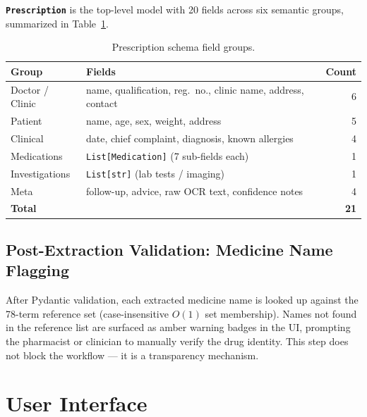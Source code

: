 \documentclass[12pt,a4paper]{article}
\begin{document}
\textbf{\texttt{Prescription}} is the top-level model with 20 fields across
six semantic groups, summarized in Table~\ref{tab:schema}.

\begin{table}[H]
\centering
\caption{Prescription schema field groups.}
\label{tab:schema}
\begin{tabular}{@{}llr@{}}
\toprule
\textbf{Group} & \textbf{Fields} & \textbf{Count} \\
\midrule
Doctor / Clinic   & name, qualification, reg.\ no., clinic name, address, contact & 6 \\
Patient           & name, age, sex, weight, address                                & 5 \\
Clinical          & date, chief complaint, diagnosis, known allergies               & 4 \\
Medications       & \texttt{List[Medication]} (7 sub-fields each)                  & 1 \\
Investigations    & \texttt{List[str]} (lab tests / imaging)                       & 1 \\
Meta              & follow-up, advice, raw OCR text, confidence notes              & 4 \\
\midrule
\textbf{Total}    &                                                                & \textbf{21} \\
\bottomrule
\end{tabular}
\end{table}

\subsection{Post-Extraction Validation: Medicine Name Flagging}

After Pydantic validation, each extracted medicine name is looked up against the
78-term reference set (case-insensitive $O(1)$ set membership). Names not found
in the reference list are surfaced as amber warning badges in the UI, prompting the
pharmacist or clinician to manually verify the drug identity. This step does not
block the workflow — it is a transparency mechanism.

\section{User Interface}
\end{document}
